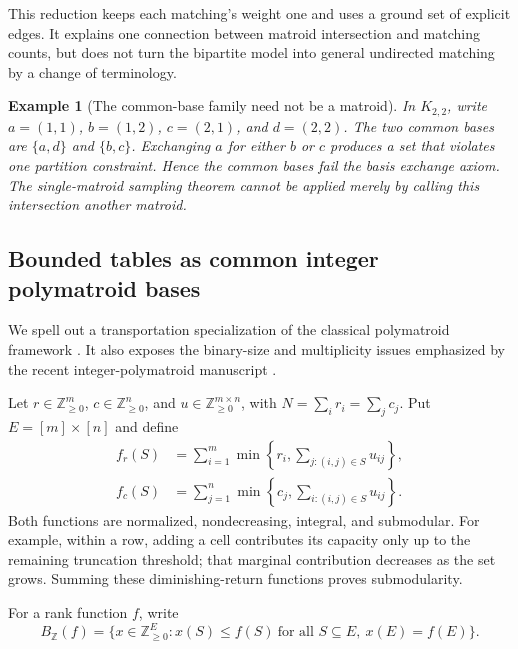 \documentclass[11pt]{article}
\newtheorem{example}[proposition]{Example}
\newcommand{\Z}{\mathbb Z}
\begin{document}
This reduction keeps each matching's weight one and uses a ground set of explicit edges. It explains one connection between matroid intersection and matching counts, but does not turn the bipartite model into general undirected matching by a change of terminology.

\begin{example}[The common-base family need not be a matroid]
In \(K_{2,2}\), write \(a=(1,1)\), \(b=(1,2)\), \(c=(2,1)\), and \(d=(2,2)\).
The two common bases are \(\{a,d\}\) and \(\{b,c\}\).
Exchanging \(a\) for either \(b\) or \(c\) produces a set that violates one partition constraint. Hence the common bases fail the basis exchange axiom. The single-matroid sampling theorem cannot be applied merely by calling this intersection another matroid.
\end{example}

\subsection{Bounded tables as common integer polymatroid bases}
We spell out a transportation specialization of the classical polymatroid framework \cite{Edmonds2003}. It also exposes the binary-size and multiplicity issues emphasized by the recent integer-polymatroid manuscript \cite{oaiPolymatroids}.

Let \(r\in\Z_{\geq0}^m\), \(c\in\Z_{\geq0}^n\), and \(u\in\Z_{\geq0}^{m\times n}\), with
\(N=\sum_i r_i=\sum_j c_j\). Put \(E=[m]\times[n]\) and define
\[
 \begin{aligned}
 f_r(S)&=\sum_{i=1}^m
      \min\!\left\{r_i,\sum_{j:(i,j)\in S}u_{ij}\right\},\\
 f_c(S)&=\sum_{j=1}^n
      \min\!\left\{c_j,\sum_{i:(i,j)\in S}u_{ij}\right\}.
 \end{aligned}
\]
Both functions are normalized, nondecreasing, integral, and submodular. For example, within a row, adding a cell contributes its capacity only up to the remaining truncation threshold; that marginal contribution decreases as the set grows. Summing these diminishing-return functions proves submodularity.

For a rank function \(f\), write
\[
 B_{\Z}(f)=\{x\in\Z_{\geq0}^{E}:x(S)\leq f(S)\ 
             \text{for all }S\subseteq E,\ x(E)=f(E)\}.
\]
\end{document}
